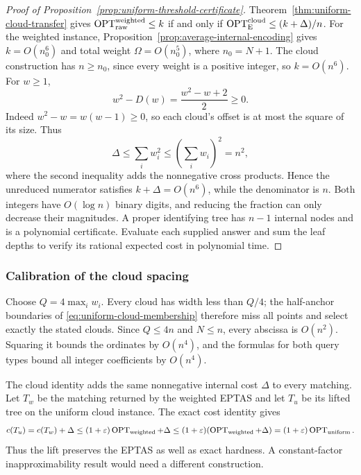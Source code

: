 \begin{proof}[Proof of Proposition~\ref{prop:uniform-threshold-certificate}]
Theorem~\ref{thm:uniform-cloud-transfer} gives
$\operatorname{OPT}_{\mathrm{raw}}^{\mathrm{weighted}}\le k$
if and only if
$\operatorname{OPT}_{\mathrm E}^{\mathrm{cloud}}\le(k+\Delta)/n$.
For the weighted instance, Proposition~\ref{prop:average-internal-encoding}
gives $k=O(n_0^6)$ and total weight $\Omega=O(n_0^5)$, where
$n_0=N+1$. The cloud construction has $n\ge n_0$, since every weight
is a positive integer, so $k=O(n^6)$. For $w\ge1$,
\[
 w^2-D(w)=\frac{w^2-w+2}{2}\ge0.
\]
Indeed $w^2-w=w(w-1)\ge0$, so each cloud's offset is at most
the square of its size.
Thus
\[
 \Delta\le\sum_iw_i^2
 \le\left(\sum_iw_i\right)^2=n^2,
\]
where the second inequality adds the nonnegative cross products.
Hence the unreduced numerator satisfies $k+\Delta=O(n^6)$, while
the denominator is $n$. Both integers have $O(\log n)$ binary digits,
and reducing the fraction can only decrease their magnitudes.
A proper identifying tree has $n-1$ internal nodes and is a polynomial
certificate. Evaluate each supplied answer and sum the leaf depths
to verify its rational expected cost in polynomial time.
\end{proof}

\subsubsection{Calibration of the cloud spacing}

\begin{parameterchoice}
Choose $Q=4\max_iw_i$. Every cloud has width less than $Q/4$;
the half-anchor boundaries of \eqref{eq:uniform-cloud-membership}
therefore miss all points and select exactly the stated clouds.
Since $Q\le4n$ and $N\le n$, every abscissa is $O(n^2)$.
Squaring it bounds the ordinates by $O(n^4)$, and the formulas for
both query types bound all integer coefficients by $O(n^4)$.
\end{parameterchoice}

\begin{remark}
The cloud identity adds the same nonnegative internal cost $\Delta$
to every matching. Let $T_w$ be the matching returned by the weighted
EPTAS and let $T_u$ be its lifted tree on the uniform cloud instance.
The exact cost identity gives
\[
 c(T_u)=c(T_w)+\Delta
 \le(1+\varepsilon)\operatorname{OPT}_{\rm weighted}+\Delta
 \le(1+\varepsilon)(\operatorname{OPT}_{\rm weighted}+\Delta)
 =(1+\varepsilon)\operatorname{OPT}_{\rm uniform}.
\]
Thus the lift preserves the EPTAS as well as exact hardness. A
constant-factor inapproximability result would need a different
construction.
\end{remark}
